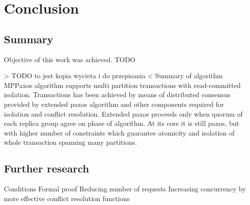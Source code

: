 
\chapter{Conclusion}\label{chapter:summary}

\section{Summary}
Objective of this work was achieved. TODO


> TODO to jest kopia wycieta i do przepisania <
Summary of algorithm
MPPaxos algorithm supports multi partition transactions with read-committed isolation. Transactions has been achieved by means of distributed consensus provided by extended paxos algorithm and other components required for isolation and conflict resolution. Extended paxos proceeds only when quorum of each replica group agree on phase of algorithm. At its core it is still paxos, but with higher number of constraints which guarantee atomicity and isolation of whole transaction spanning many partitions.

\section{Further research}
Conditions
Formal proof
Reducing number of requests
Increasing concurrency by more effective conflict resolution functions


